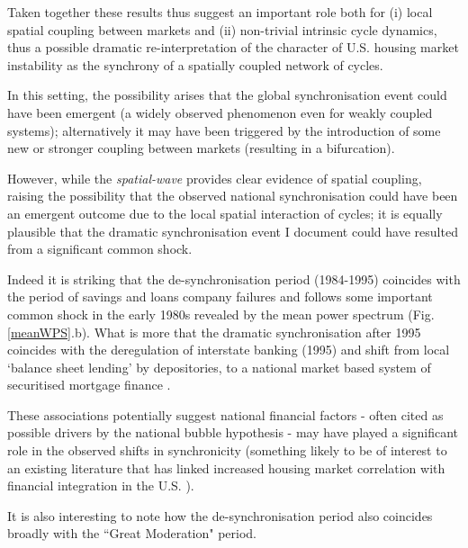 \documentclass[11pt]{article}
\begin{document}
Taken together these results thus suggest an important role both for (i) local spatial coupling between markets and (ii) non-trivial intrinsic cycle dynamics, thus a possible dramatic re-interpretation of the character of U.S. housing market instability as the synchrony of a spatially coupled network of cycles.

In this setting, the possibility arises that the global synchronisation event could have been emergent (a widely observed phenomenon even for weakly coupled systems); alternatively it may have been triggered by the introduction of some new or stronger coupling between markets (resulting in a bifurcation). 

However, while the \textit{spatial-wave} provides clear evidence of spatial coupling, raising the possibility that the observed national synchronisation could have been an emergent outcome due to the local spatial interaction of cycles; it is equally plausible that the dramatic synchronisation event I document could have resulted from a significant common shock.

Indeed it is striking that the de-synchronisation period (1984-1995) coincides with the period of savings and loans company failures \citep{Green2005,Snowden1997} and follows some important common shock in the early 1980s revealed by the mean power spectrum (Fig.\ref{meanWPS}.b). What is more that the dramatic synchronisation after 1995 coincides with the deregulation of interstate banking (1995) and shift from local ‘balance sheet lending’ by depositories, to a national market based system of securitised mortgage finance \citep{Schnure2005}. 

These associations potentially suggest national financial factors - often cited as possible drivers by the national bubble hypothesis - may have played a significant role in the observed shifts in synchronicity (something likely to be of interest to an existing literature that has linked increased housing market correlation with financial integration in the U.S. \citep{Landier2017,Klyuev2008}). %

It is also interesting to note how the de-synchronisation period also coincides broadly with the ``Great Moderation" period.%
\end{document}

